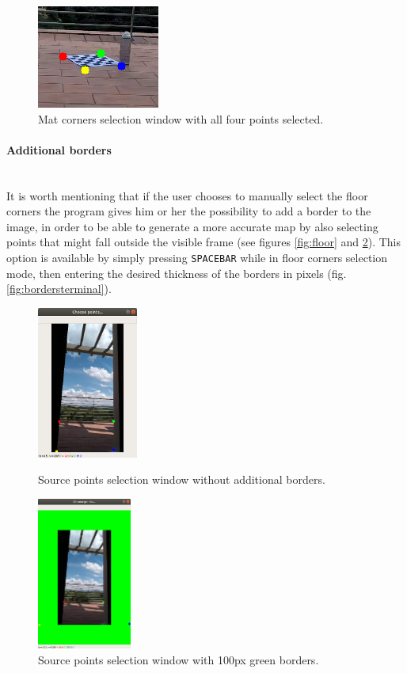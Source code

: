 \documentclass[12pt]{article}
\newcommand{\subsubsubsection}[1]{\paragraph{#1}\mbox{}\\}
\begin{document}
\begin{figure}[H]
\begin{center}
    \includegraphics[width=0.3\linewidth]{img/chess_selection.jpg}
\end{center}
   \caption{Mat corners selection window with all four points selected.}
\label{fig:chessselection}
\end{figure}

\subsubsubsection{Additional borders}
\label{chap:borders}
It is worth mentioning that if the user chooses to manually select the floor corners the program gives him or her the possibility to add a border to the image, in order to be able to generate a more accurate map by also selecting points that might fall outside the visible frame (see figures \ref{fig:floor} and \ref{fig:borders}). This option is available by simply pressing \lstinline{SPACEBAR} while in floor corners selection mode, then entering the desired thickness of the borders in pixels (fig. \ref{fig:bordersterminal}).

\begin{figure}[H]
  \centering
  \begin{minipage}[b]{0.45\textwidth}
    \centering
    \includegraphics[height=5cm,keepaspectratio]{img/floor_selection.jpg}
    \caption{Source points selection window without additional borders.}
    \label{fig:floor}
  \end{minipage}
  \hfill
  \begin{minipage}[b]{0.45\textwidth}
    \centering
    \includegraphics[height=5cm,keepaspectratio]{img/borders.png}
    \caption{Source points selection window with 100px green borders.}
    \label{fig:borders}
  \end{minipage}
\end{figure}
\end{document}
